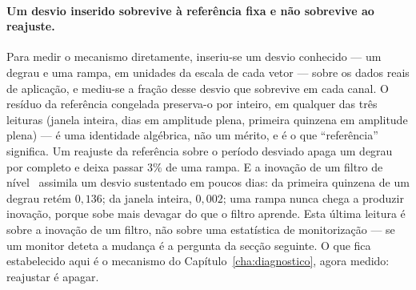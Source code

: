 \paragraph{Um desvio inserido sobrevive à referência fixa e não sobrevive ao
reajuste.} Para medir o mecanismo diretamente, inseriu-se um desvio
conhecido --- um degrau e uma rampa, em unidades da escala de cada vetor
--- sobre os dados reais de aplicação, e mediu-se a fração desse desvio que
sobrevive em cada canal. O resíduo da referência congelada preserva-o por
inteiro, em qualquer das três leituras (janela inteira, dias em amplitude
plena, primeira quinzena em amplitude plena) --- é uma identidade algébrica,
não um mérito, e é o que ``referência'' significa. Um reajuste da referência
sobre o período desviado apaga um degrau por completo e deixa passar $3\%$
de uma rampa. E a inovação de um filtro de nível~\cite{DurbinKoopman2012} assimila um
desvio sustentado em poucos dias: da primeira quinzena de um degrau retém
$0{,}136$; da janela inteira, $0{,}002$; uma rampa nunca chega a produzir
inovação, porque sobe mais devagar do que o filtro aprende. Esta última
leitura é sobre a inovação de um filtro, não sobre uma estatística de
monitorização --- se um monitor deteta a mudança é a pergunta da secção
seguinte. O que fica estabelecido aqui é o mecanismo do
Capítulo~\ref{cha:diagnostico}, agora medido: reajustar é apagar.


